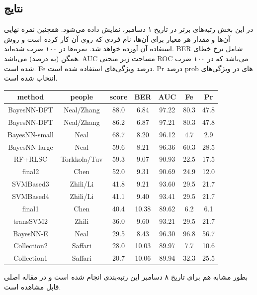 \documentclass[a4paper, 12pt]{article}
\begin{document}
 \subsection*{نتایج}
 در این بخش رتبه‌های برتر در تاریخ ۱ دسامبر، نمایش داده می‌شود. همچنین نمره نهایی آن‌ها و مقدار هر معیار برای آن‌ها، نام فردی که روی آن کار کرده است و روش استفاده آن آورده خواهد شد. نمره‌ها در ۱۰۰ ضرب شده‌اند.
 BER
 شامل نرخ خطای همگن (به درصد) می‌باشد. 
 AUC
 مساحت زیر منحنی ROC می‌باشد که در ۱۰۰ ضرب شده است.
 Fe
 درصد ویژگی‌های استفاده شده است.
 Pr
 درصد prob های در ویژگی‌های انتخاب شده است.
 
 \begin{latin}
 	\begin{center}
 		\begin{tabular}{|c|c|c|c|c|c|c|}
 			\hline
 			method&
 			people&
 			score &
 			BER & AUC& Fe & Pr
 			\\\hline
 			BayesNN-DFT 
 			&
 			Neal/Zhang
 			&
 			88.0
 			&
 			6.84
 			&
 			97.22
 			&
 			80.3
 			&
 			47.8
 			\\\hline
 			BayesNN-DFT & Neal/Zhang & 86.2 & 6.87 & 97.21 & 80.3 & 47.8
 			\\\hline
 			BayesNN-small & Neal & 68.7 & 8.20 & 96.12 & 4.7 & 2.9
 			\\\hline
 			BayesNN-large& Neal& 59.6 &8.21 & 96.36 
 			& 60.3 & 28.5
 			\\\hline
 			RF+RLSC & Torkkola/Tuv& 59.3& 9.07&  90.93& 22.5& 17.5
 			\\\hline
 			final2 &Chen &52.0 &9.31 &90.69 & 24.9 &12.0
 			\\\hline
 			SVMBased3 &Zhili/Li& 41.8 &9.21&93.60 &29.5& 21.7
 			\\\hline
 			SVMBased4 & Zhili/Li&  41.1& 9.40 & 93.41 & 29.5 &21.7
 			\\\hline
 			final1 &Chen& 40.4 &10.38& 89.62&  6.2& 6.1
 			\\\hline
 			transSVM2 &Zhili& 36.0& 9.60&  93.21&  29.5& 21.7
 			\\\hline
 			BayesNN-E &Neal& 29.5& 8.43& 96.30 & 96.8& 56.7
 			\\\hline
 			Collection2 & Saffari& 28.0& 10.03&  89.97 & 7.7 &10.6
 			\\\hline
 			Collection1 &Saffari &20.7 &10.06& 89.94&32.3 & 25.5
 			\\\hline
 		\end{tabular}
 		
 	\end{center}
 \end{latin}
بطور مشابه هم برای تاریخ ۸ دسامبر این رتبه‌بندی انجام شده‌ است و در مقاله اصلی قابل مشاهده است.
\end{document}

